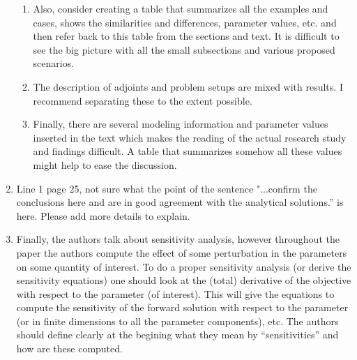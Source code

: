 \documentclass{article}
\begin{document}
\begin{enumerate}
\begin{enumerate}[label=(\alph*)]
        \item  Also, consider creating a table that summarizes all the examples and cases, shows the similarities and differences, parameter values, etc. and then refer back to this table from the sections and text. It is difficult to see the big picture with all the small subsections and various proposed scenarios.

        \item The description of adjoints and problem setups are mixed with results. I recommend separating these to the extent possible.

        \item Finally, there are several modeling information and parameter values inserted in the text which makes the reading of the actual research study and findings difficult. A table that summarizes somehow all these values might help to ease the discussion.
    \end{enumerate}


    \item Line 1 page 25, not sure what the point of the sentence "...confirm the conclusions here and are in good agreement with the analytical solutions.” is here. Please add more details to explain.
    
    \item  Finally, the authors talk about sensitivity analysis, however throughout the paper the authors compute the effect of some perturbation in the parameters on some quantity of interest. To do a proper sensitivity analysis (or derive the sensitivity equations) one should look at the (total) derivative of the objective with respect to the parameter (of interest). This will give the equations to compute the sensitivity of the forward solution with respect to the parameter (or in finite dimensions to all the parameter components), etc. The authors should define clearly at the begining what they mean by “sensitivities” and how are these computed.

\end{enumerate}
\end{document}
